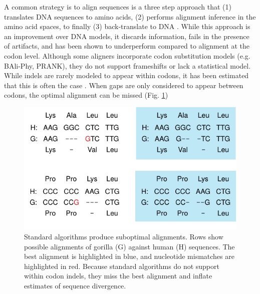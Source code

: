 A common strategy is to align sequences is a three step approach that (1)
translates DNA sequences to amino acids, (2) performs alignment inference
in the amino acid spaces, to finally (3) back-translate to DNA
\parencite{bininda2005transalign, abascal2010translatorx}.
While this approach is an improvement over DNA models, it discards information,
fails in the presence of artifacts, and has been shown to underperform compared
to alignment at the codon level.
Although some aligners incorporate codon substitution models (e.g. BAli-Phy,
PRANK), they do not support frameshifts or lack a statistical model.
While indels are rarely modeled to appear within codons, it has been estimated
that this is often the case \parencite{indel_phases_zhu_2019}.
When gaps are only considered to appear between codons, the optimal alignment
can be missed (Fig. \ref{fig:indels})

\begin{figure}[h!]
  \begin{minipage}[c]{0.6\textwidth}
    \includegraphics[scale=1]{./figures/fig-aln.pdf}
  \end{minipage}\hfill
  \begin{minipage}[c]{0.4\textwidth}
	\caption{Standard algorithms produce suboptimal alignments.
		Rows show possible alignments of gorilla (G) against human (H) sequences.
		The best alignment is highlighted in blue, and nucleotide mismatches are highlighted in red.
		Because standard algorithms do not support within codon indels, they miss the best
		alignment and inflate estimates of sequence divergence.}
	\label{fig:indels}
  \end{minipage}
\end{figure}

